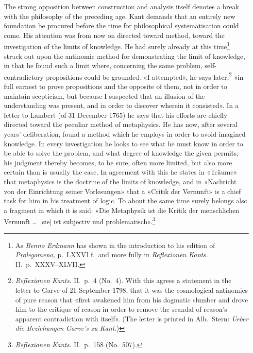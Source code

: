\documentclass[12pt,a4paper]{article}
\newcommand{\opage}[1]{\marginnote{\footnotesize\textit{[#1]}}}
\begin{document}
\opage{22}The strong opposition between construction and analysis itself denotes a
break with the philosophy of the preceding age. Kant demands that an
entirely new foundation be procured before the time for philosophical
systematisation could come. His attention was from now on directed toward
method, toward the investigation of the limits of knowledge. He had surely
already at this time\footnote{As \emph{Benno Erdmann} has shown in the
introduction to his edition of \textit{Prolegomena,} p.\ LXXVI f.\ and
more fully in \textit{Reflexionen Kants.} II.\ p.\ XXXV--XLVII.} struck out
upon the antinomic method for demonstrating the limit of knowledge, in
that he found such a limit where, concerning the same problem,
self-contradictory propositions could be grounded. «I attempted», he says
later,\footnote{\textit{Reflexionen Kants.} II.\ p.\ 4 (No.\ 4). With this
agrees a statement in the letter to Garve of 21 September 1798, that it was
the cosmological antinomies of pure reason that «first awakened him from
his dogmatic slumber and drove him to the critique of reason in order to
remove the scandal of reason's apparent contradiction with itself». (The
letter is printed in Alb.\ Stern: \textit{Ueber die Beziehungen Garve's zu
Kant.})} «in full earnest to prove propositions and the opposite of them,
not in order to maintain scepticism, but because I suspected that an
illusion of the understanding was present, and in order to discover wherein
it consisted». In a letter to Lambert (of 31 December 1765) he says that
his efforts are chiefly directed toward the peculiar method of
metaphysics. He has now, after several years' deliberation, found a method
which he employs in order to avoid imagined knowledge. In every
investigation he looks to see what he must know in order to be able to
solve the problem, and what degree of knowledge the given permits; his
judgment thereby becomes, to be sure, often more limited, but also more
certain than is usually the case. In agreement with this he states in
«Träume» that metaphysics is the doctrine of the limits of knowledge, and
in «Nachricht von der Einrichtung seiner Vorlesungen» that a «Critik der
Vernunft» is a chief task for him in his treatment of logic. To about the
same time surely belongs also a fragment in which it is said: «Die
Metaphysik ist die Kritik der menschlichen Vernunft \ldots\ [sie] ist
subjectiv und problematisch».\footnote{\textit{Reflexionen Kants.} II.\
p.\ 158 (No.\ 507).}
\end{document}

